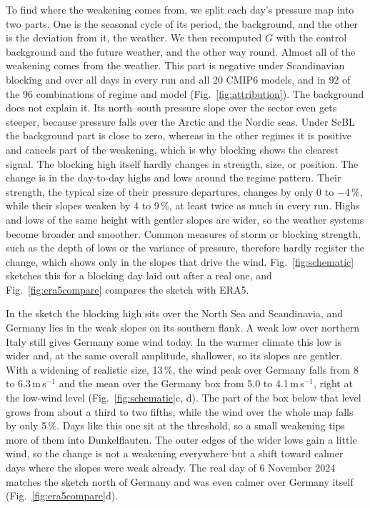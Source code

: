 \documentclass[10pt,a4paper]{article}
\begin{document}
To find where the weakening comes from, we split each day's pressure map into two parts.
One is the seasonal cycle of its period, the background, and the other is the deviation from it, the weather.
We then recomputed $G$ with the control background and the future weather, and the other way round.
Almost all of the weakening comes from the weather.
This part is negative under Scandinavian blocking and over all days in every run and all 20 CMIP6 models, and in 92
of the 96 combinations of regime and model (Fig.~\ref{fig:attribution}).
The background does not explain it.
Its north--south pressure slope over the sector even gets steeper, because pressure falls over the Arctic and the
Nordic seas.
Under ScBL the background part is close to zero, whereas in the other regimes it is positive and cancels part of the
weakening, which is why blocking shows the clearest signal.
The blocking high itself hardly changes in strength, size, or position.
The change is in the day-to-day highs and lows around the regime pattern.
Their strength, the typical size of their pressure departures, changes by only 0 to $-$4\,\%, while their slopes
weaken by 4 to 9\,\%, at least twice as much in every run.
Highs and lows of the same height with gentler slopes are wider, so the weather systems become broader and smoother.
Common measures of storm or blocking strength, such as the depth of lows or the variance of pressure, therefore hardly
register the change, which shows only in the slopes that drive the wind.
Fig.~\ref{fig:schematic} sketches this for a blocking day laid out after a real one, and
Fig.~\ref{fig:era5compare} compares the sketch with ERA5.

In the sketch the blocking high sits over the North Sea and Scandinavia, and Germany lies in the weak slopes on its
southern flank.
A weak low over northern Italy still gives Germany some wind today.
In the warmer climate this low is wider and, at the same overall amplitude, shallower, so its slopes are gentler.
With a widening of realistic size, 13\,\%, the wind peak over Germany falls from 8 to 6.3\,m\,s$^{-1}$ and the mean
over the Germany box from 5.0 to 4.1\,m\,s$^{-1}$, right at the low-wind level (Fig.~\ref{fig:schematic}c, d).
The part of the box below that level grows from about a third to two fifths, while the wind over the whole map falls by
only 5\,\%.
Days like this one sit at the threshold, so a small weakening tips more of them into Dunkelflauten.
The outer edges of the wider lows gain a little wind, so the change is not a weakening everywhere but a shift toward
calmer days where the slopes were weak already.
The real day of 6 November 2024 matches the sketch north of Germany and was even calmer over Germany itself
(Fig.~\ref{fig:era5compare}d).
\end{document}

